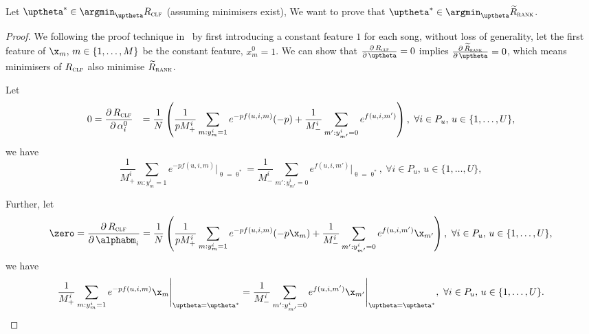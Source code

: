 Let $\uptheta^* \in \argmin_{\uptheta} R_\textsc{clf}$ (assuming minimisers exist),
We want to prove that $\uptheta^* \in \argmin_{\uptheta} \widetilde R_\textsc{rank}$.

\begin{proof}
We following the proof technique in~\cite{ertekin2011equivalence}
by first introducing a constant feature $1$ for each song,
without loss of generality, let the first feature of $\x_m, \, m \in \{1,\dots,M\}$ be the constant feature, \ie $x_m^0 = 1$.
We can show that
$\frac{\partial \, R_\textsc{clf}} {\partial \, \uptheta} = 0$ implies
$\frac{\partial \, \widetilde R_\textsc{rank}} {\partial \, \uptheta} = 0$,
which means minimisers of $R_\textsc{clf}$ also minimise $\widetilde R_\textsc{rank}$.

Let 
\begin{equation*}
\begin{aligned}
0 
&= \frac{\partial \, R_\textsc{clf}} {\partial \, \alpha_i^0}
&= \frac{1}{N} \left( 
   \frac{1}{p M_+^i} \sum_{m: y_m^i = 1} e^{-p f(u, i, m)} (-p)
   + \frac{1}{M_-^i} \sum_{m': y_{m'}^i = 0} e^{f(u, i, m')} \right),
\ \forall i \in P_u, \, u \in \{1,\dots,U\},
\end{aligned}
\end{equation*}
we have
\begin{equation}
\label{eq:eq1}
\frac{1}{M_+^i} \sum_{m: y_m^i = 1} e^{-p f(u, i, m)} \Bigg|_{\uptheta = \uptheta^*}
= \frac{1}{M_-^i} \sum_{m': y_{m'}^i = 0} e^{f(u, i, m')} \Bigg|_{\uptheta = \uptheta^*}, 
\ \forall i \in P_u, \, u \in \{1,\dots,U\},
\end{equation}

Further, let
\begin{equation*}
\zero 
= \frac{\partial \, R_\textsc{clf}} {\partial \, \alphabm_i} 
= \frac{1}{N} \left( 
   \frac{1}{p M_+^i} \sum_{m: y_m^i = 1} e^{-p f(u, i, m)} (-p \x_m)
   + \frac{1}{M_-^i} \sum_{m': y_{m'}^i = 0} e^{f(u, i, m')} \x_{m'} \right),
\ \forall i \in P_u, \, u \in \{1,\dots,U\},
\end{equation*}
we have
\begin{equation}
\label{eq:eq2}
\frac{1}{M_+^i} \sum_{m: y_m^i = 1} e^{-p f(u, i, m)} \x_m \Bigg|_{\uptheta = \uptheta^*}
= \frac{1}{M_-^i} \sum_{m': y_{m'}^i = 0} e^{f(u, i, m')} \x_{m'} \Bigg|_{\uptheta = \uptheta^*},
\ \forall i \in P_u, \, u \in \{1,\dots,U\}.
\end{equation}


\end{proof}
